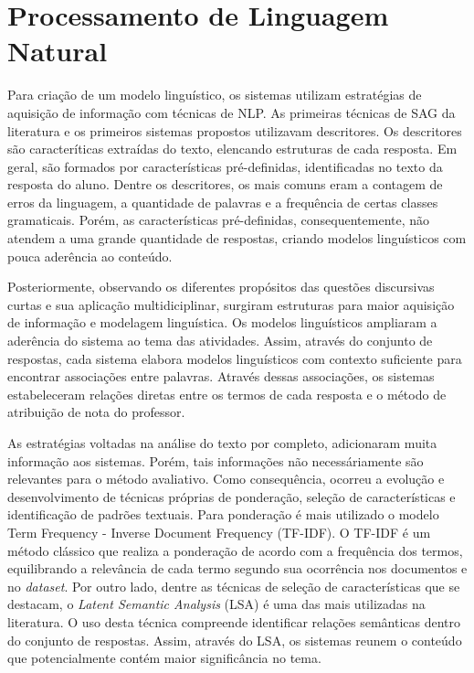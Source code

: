 \section{Processamento de Linguagem Natural}

Para criação de um modelo linguístico, os sistemas utilizam estratégias de aquisição de informação com técnicas de NLP. As primeiras técnicas de SAG da literatura e os primeiros sistemas propostos utilizavam descritores. Os descritores são caracteríticas extraídas do texto, elencando estruturas de cada resposta. Em geral, são formados por características pré-definidas, identificadas no texto da resposta do aluno. Dentre os descritores, os mais comuns eram a contagem de erros da linguagem, a quantidade de palavras e a frequência de certas classes gramaticais. Porém, as características pré-definidas, consequentemente, não atendem a uma grande quantidade de respostas, criando modelos linguísticos com pouca aderência ao conteúdo.

Posteriormente, observando os diferentes propósitos das questões discursivas curtas e sua aplicação multidiciplinar, surgiram estruturas para maior aquisição de informação e modelagem linguística. Os modelos linguísticos ampliaram a aderência do sistema ao tema das atividades. Assim, através do conjunto de respostas, cada sistema elabora modelos linguísticos com contexto suficiente para encontrar associações entre palavras. Através dessas associações, os sistemas estabeleceram relações diretas entre os termos de cada resposta e o método de atribuição de nota do professor.

As estratégias voltadas na análise do texto por completo, adicionaram muita informação aos sistemas. Porém, tais informações não necessáriamente são relevantes para o método avaliativo. Como consequência, ocorreu a evolução e desenvolvimento de técnicas próprias de ponderação, seleção de características e identificação de padrões textuais. Para ponderação é mais utilizado o modelo Term Frequency - Inverse Document Frequency (TF-IDF). O TF-IDF é um método clássico que realiza a ponderação de acordo com a frequência dos termos, equilibrando a relevância de cada termo segundo sua ocorrência nos documentos e no \textit{dataset}. Por outro lado, dentre as técnicas de seleção de características que se destacam, o \textit{Latent Semantic Analysis} (LSA) é uma das mais utilizadas na literatura. O uso desta técnica compreende identificar relações semânticas dentro do conjunto de respostas. Assim, através do LSA, os sistemas reunem o conteúdo que potencialmente contém maior significância no tema.


